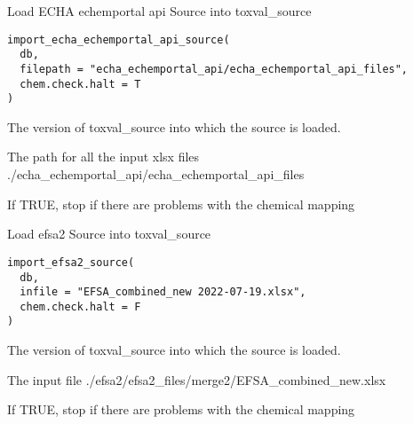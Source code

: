 \documentclass[letterpaper]{book}
\begin{document}
%
\begin{Description}\relax
Load ECHA echemportal api Source into toxval\_source
\end{Description}
%
\begin{Usage}
\begin{verbatim}
import_echa_echemportal_api_source(
  db,
  filepath = "echa_echemportal_api/echa_echemportal_api_files",
  chem.check.halt = T
)
\end{verbatim}
\end{Usage}
%
\begin{Arguments}
\begin{ldescription}
\item[\code{db}] The version of toxval\_source into which the source is loaded.

\item[\code{filepath}] The path for all the input xlsx files ./echa\_echemportal\_api/echa\_echemportal\_api\_files

\item[\code{chem.check.halt}] If TRUE, stop if there are problems with the chemical mapping
\end{ldescription}
\end{Arguments}
%
\begin{Description}\relax
Load efsa2 Source into toxval\_source
\end{Description}
%
\begin{Usage}
\begin{verbatim}
import_efsa2_source(
  db,
  infile = "EFSA_combined_new 2022-07-19.xlsx",
  chem.check.halt = F
)
\end{verbatim}
\end{Usage}
%
\begin{Arguments}
\begin{ldescription}
\item[\code{db}] The version of toxval\_source into which the source is loaded.

\item[\code{infile}] The input file ./efsa2/efsa2\_files/merge2/EFSA\_combined\_new.xlsx

\item[\code{chem.check.halt}] If TRUE, stop if there are problems with the chemical mapping
\end{ldescription}
\end{Arguments}
\end{document}

